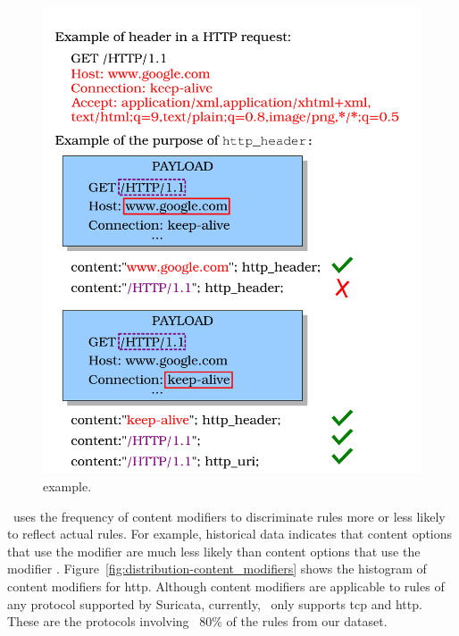 \documentclass[sigconf,review, anonymous]{acmart}
\begin{document}
\begin{figure}[h!]
\centering
\includegraphics[scale=0.5]{figs/http_header-example.png}
\caption{ example.}
\label{fig:http-header-example}
\end{figure}


\tname\ uses the frequency of content modifiers to discriminate rules
more or less likely to reflect actual rules. For example, historical
data indicates that content options that use the
 modifier are much less likely than content
options that use the modifier
. Figure~\ref{fig:distribution-content_modifiers}
shows the histogram of content modifiers for http. Although content
modifiers are applicable to rules of any protocol supported by
Suricata, currently, \tname\ only supports tcp and http. These are the
protocols involving ~80\% of the rules from our dataset.
\end{document}
